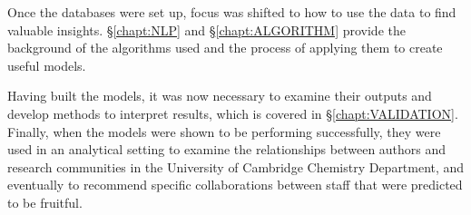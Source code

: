 Once the databases were set up, focus was shifted to how to use the data to find valuable insights. \S\ref{chapt:NLP} and \S\ref{chapt:ALGORITHM} provide the background of the algorithms used and the process of applying them to create useful models. 

Having built the models, it was now necessary to examine their outputs and develop methods to interpret results, which is covered in \S\ref{chapt:VALIDATION}. Finally, when the models were shown to be performing successfully, they were used in an analytical setting to examine the relationships between authors and research communities in the University of Cambridge Chemistry Department, and eventually to recommend specific collaborations between staff that were predicted to be fruitful.
 

